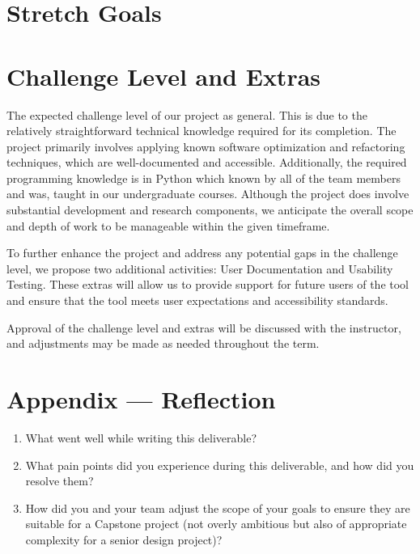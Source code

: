 \documentclass{article}
\begin{document}
\section{Stretch Goals}

\section{Challenge Level and Extras}

The expected challenge level of our project as general. This is due to the 
relatively straightforward technical knowledge required for its completion. 
The project primarily involves applying known software optimization and 
refactoring techniques, which are well-documented and accessible. 
Additionally, the required programming knowledge is in Python which known 
by all of the team members and was, taught in our undergraduate courses. 
Although the project does involve substantial development and research components, 
we anticipate the overall scope and depth of work to be manageable within the 
given timeframe.

To further enhance the project and address any potential gaps in the challenge level, 
we propose two additional activities: User Documentation and Usability Testing. 
These extras will allow us to provide support for future users of the tool and 
ensure that the tool meets user expectations and accessibility standards. 

Approval of the challenge level and extras will be discussed with the instructor, 
and adjustments may be made as needed throughout the term.

\newpage{}

\section*{Appendix --- Reflection}




\begin{enumerate}
  \item What went well while writing this deliverable?

    \textit{}
  \item What pain points did you experience during this deliverable, and how
    did you resolve them?
  \item How did you and your team adjust the scope of your goals to ensure
    they are suitable for a Capstone project (not overly ambitious but also of
    appropriate complexity for a senior design project)?
\end{enumerate}
\end{document}
